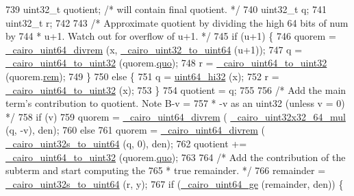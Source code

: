 \begin{DoxyCode}
739         uint32\_t quotient;      \textcolor{comment}{/* will contain final quotient. */}
740         uint32\_t q;
741         uint32\_t r;
742 
743         \textcolor{comment}{/* Approximate quotient by dividing the high 64 bits of num by}
744 \textcolor{comment}{         * u+1. Watch out for overflow of u+1. */}
745         \textcolor{keywordflow}{if} (u+1) \{
746             quorem = \hyperlink{cairo-wideint_8c_a621ed7ef4c3a60376cf0296db7a9cbef}{\_cairo\_uint64\_divrem} (x, 
      \hyperlink{cairo-wideint-private_8h_ae6926b42ba8d416207a6327091462d3d}{\_cairo\_uint32\_to\_uint64} (u+1));
747             q = \hyperlink{cairo-wideint-private_8h_a061bc60ff1861b1bc47c7e344f5557dd}{\_cairo\_uint64\_to\_uint32} (quorem.\hyperlink{struct__cairo__uquorem64_aa1ba1d4582ee46d1769ff01d63242ac8}{quo});
748             r = \hyperlink{cairo-wideint-private_8h_a061bc60ff1861b1bc47c7e344f5557dd}{\_cairo\_uint64\_to\_uint32} (quorem.\hyperlink{struct__cairo__uquorem64_af360df0b81f94d6ac85f4cec13bb7431}{rem});
749         \}
750         \textcolor{keywordflow}{else} \{
751             q = \hyperlink{cairo-wideint_8c_a8140801e22e4b973bf94d6e94680f96e}{uint64\_hi32} (x);
752             r = \hyperlink{cairo-wideint-private_8h_a061bc60ff1861b1bc47c7e344f5557dd}{\_cairo\_uint64\_to\_uint32} (x);
753         \}
754         quotient = q;
755 
756         \textcolor{comment}{/* Add the main term's contribution to quotient.  Note B-v =}
757 \textcolor{comment}{         * -v as an uint32 (unless v = 0) */}
758         \textcolor{keywordflow}{if} (v)
759             quorem = \hyperlink{cairo-wideint_8c_a621ed7ef4c3a60376cf0296db7a9cbef}{\_cairo\_uint64\_divrem} (
      \hyperlink{cairo-wideint-private_8h_a575f3101382f6223038c6d9f457a37be}{\_cairo\_uint32x32\_64\_mul} (q, -v), den);
760         \textcolor{keywordflow}{else}
761             quorem = \hyperlink{cairo-wideint_8c_a621ed7ef4c3a60376cf0296db7a9cbef}{\_cairo\_uint64\_divrem} (
      \hyperlink{cairo-wideint_8c_a6ceaa8499ff57c64a3662d1a3f4c2a1f}{\_cairo\_uint32s\_to\_uint64} (q, 0), den);
762         quotient += \hyperlink{cairo-wideint-private_8h_a061bc60ff1861b1bc47c7e344f5557dd}{\_cairo\_uint64\_to\_uint32} (quorem.\hyperlink{struct__cairo__uquorem64_aa1ba1d4582ee46d1769ff01d63242ac8}{quo});
763 
764         \textcolor{comment}{/* Add the contribution of the subterm and start computing the}
765 \textcolor{comment}{         * true remainder. */}
766         remainder = \hyperlink{cairo-wideint_8c_a6ceaa8499ff57c64a3662d1a3f4c2a1f}{\_cairo\_uint32s\_to\_uint64} (r, y);
767         \textcolor{keywordflow}{if} (\hyperlink{cairo-wideint-private_8h_a5be6bbec2247f8f89c0904b9aa6fc012}{\_cairo\_uint64\_ge} (remainder, den)) \{

\end{DoxyCode}
